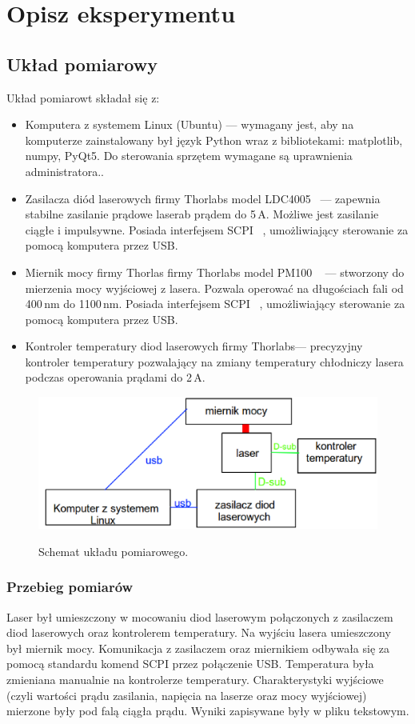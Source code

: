 \chapter{Opisz eksperymentu}
\section{Układ pomiarowy}
Układ pomiarowt składał się z:
\begin{itemize}
\item Komputera z systemem Linux (Ubuntu) --- wymagany jest, aby na komputerze zainstalowany był język Python wraz z bibliotekami:
matplotlib, numpy, PyQt5. Do sterowania sprzętem wymagane są uprawnienia administratora..
\item Zasilacza diód laserowych firmy Thorlabs model LDC4005 ~\cite{Ldc_book}--- zapewnia stabilne zasilanie prądowe laserab prądem do 5\,A.
Możliwe jest zasilanie ciągłe i impulsywne. Posiada interfejsem SCPI ~\cite{Ldc_book_prog}, umożliwiający sterowanie za pomocą komputera przez USB.
\item Miernik mocy firmy Thorlas firmy Thorlabs model PM100 ~\cite{Pm100_book} --- stworzony do mierzenia mocy wyjściowej z lasera. Pozwala operować na
długościach fali od 400\,nm do 1100\,nm. Posiada interfejsem SCPI ~\cite{Pm100_book}, umożliwiający sterowanie za pomocą komputera przez USB.
\item Kontroler temperatury diod laserowych firmy Thorlabs--- precyzyjny kontroler temperatury pozwalający na zmiany temperatury
chłodniczy lasera podczas operowania prądami do 2\,A.
\end{itemize}
\begin{figure}
\center
  \includegraphics[scale=0.35]{schemat.eps}
  \label{rys1}
  \caption{Schemat układu pomiarowego.}
\end{figure}
\subsection{Przebieg pomiarów}
Laser był umieszczony w mocowaniu diod laserowym połączonych z zasilaczem diod laserowych oraz kontrolerem temperatury.
Na wyjściu lasera umieszczony był miernik mocy. Komunikacja z zasilaczem oraz miernikiem odbywała się za pomocą standardu
komend SCPI przez połączenie USB. Temperatura była zmieniana manualnie na kontrolerze temperatury.
Charakterystyki wyjściowe (czyli wartości prądu zasilania, napięcia na laserze oraz mocy wyjściowej)
mierzone były pod falą ciągła prądu. Wyniki zapisywane były w pliku tekstowym.